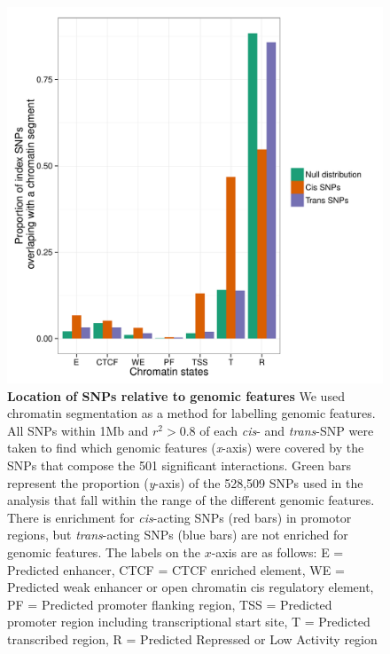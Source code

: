 \documentclass{article}
\begin{document}
\begin{figure}
	\centering
	\includegraphics[width=5in]{ChromatinStatesOverlapFixedOrder}
	\caption{\textbf{Location of SNPs relative to genomic features} We used chromatin segmentation \cite{Hoffman2012} as a method for labelling genomic features. All SNPs within 1Mb and $r^2 > 0.8$ of each \emph{cis}- and \emph{trans}-SNP were taken to find which genomic features (\emph{x}-axis) were covered by the SNPs that compose the 501 significant interactions. Green bars represent the proportion (\emph{y}-axis) of the 528,509 SNPs used in the analysis that fall within the range of the different genomic features. There is enrichment for \emph{cis}-acting SNPs (red bars) in promotor regions, but \emph{trans}-acting SNPs (blue bars) are not enriched for genomic features. The labels on the $x$-axis are as follows: E = Predicted enhancer, CTCF = CTCF enriched element, WE = Predicted weak enhancer or open chromatin cis regulatory element, PF = Predicted promoter flanking region, TSS = Predicted promoter region including transcriptional start site, T = Predicted transcribed region, R = Predicted Repressed or Low Activity region}
	\label{fig:snplocations}
\end{figure}
\clearpage
\end{document}
